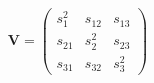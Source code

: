 \begin{equation*}
	\bm{V} =
	\begin{pmatrix}
		s_1^2  & s_{12} & s_{13} \\
		s_{21} & s_2^2  & s_{23} \\
		s_{31} & s_{32} & s_3^2
	\end{pmatrix}
\end{equation*}
